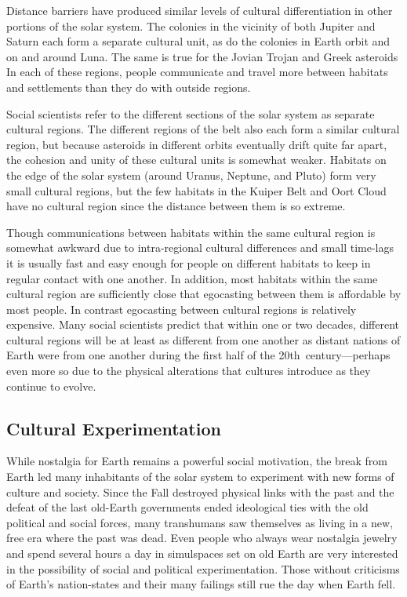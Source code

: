 Distance barriers have produced similar levels of 
cultural differentiation in other portions of the solar 
system. The colonies in the vicinity of both Jupiter 
and Saturn each form a separate cultural unit, as do 
the colonies in Earth orbit and on and around Luna. 
The same is true for the Jovian Trojan and Greek asteroids
In each of these regions, people communicate
and travel more between habitats and settlements 
than they do with outside regions.

Social scientists refer to the different sections of the 
solar system as separate cultural regions. The different 
regions of the belt also each form a similar cultural 
region, but because asteroids in different orbits eventually
drift quite far apart, the cohesion and unity of
these cultural units is somewhat weaker. Habitats on 
the edge of the solar system (around Uranus, Neptune, 
and Pluto) form very small cultural regions, but the 
few habitats in the Kuiper Belt and Oort Cloud have 
no cultural region since the distance between them is 
so extreme.

Though communications between habitats within 
the same cultural region is somewhat awkward due 
to intra-regional cultural differences and small time-lags
it is usually fast and easy enough for people on
different habitats to keep in regular contact with one 
another. In addition, most habitats within the same 
cultural region are sufficiently close that egocasting 
between them is affordable by most people. In contrast
egocasting between cultural regions is relatively
expensive. Many social scientists predict that within 
one or two decades, different cultural regions will be 
at least as different from one another as distant nations
of Earth were from one another during the first
half of the 20th century—perhaps even more so due 
to the physical alterations that cultures introduce as 
they continue to evolve.

\subsection{Cultural Experimentation}

While nostalgia for Earth remains a powerful social 
motivation, the break from Earth led many inhabitants
of the solar system to experiment with new
forms of culture and society. Since the Fall destroyed 
physical links with the past and the defeat of the last 
old-Earth governments ended ideological ties with the 
old political and social forces, many transhumans saw 
themselves as living in a new, free era where the past 
was dead. Even people who always wear nostalgia 
jewelry and spend several hours a day in simulspaces 
set on old Earth are very interested in the possibility 
of social and political experimentation. Those without 
criticisms of Earth's nation-states and their many failings
still rue the day when Earth fell.

